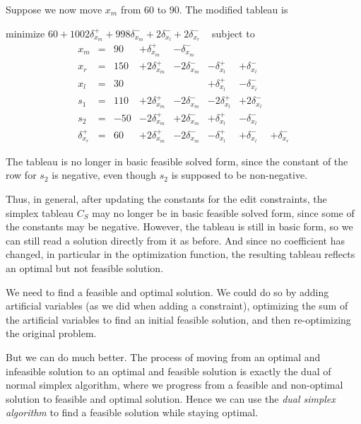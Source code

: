 \documentclass{article}
\begin{document}
Suppose we now move $x_m$ from 60 to 90.  
The modified tableau is 
\begin{trivlist}\item
minimize $60 + 1002 \delta_{x_m}^+ + 998 \delta_{x_m}^-  + 2
\delta_{x_l}^- + 2\delta_{x_r}^- $ 
~ subject to 
$$
\begin{array}{rlrrrrrr} 
x_m & = &90 &  + \delta_{x_m}^+ & - \delta_{x_m}^- \\
x_r & = &150 & + 2 \delta_{x_m}^+ & - 2\delta_{x_m}^- &
                - \delta_{x_l}^+ & + \delta_{x_l}^- \\ \hline
x_l & = & 30  & & & + \delta_{x_l}^+ & - \delta_{x_l}^- \\
s_1 & = &110 &  + 2 \delta_{x_m}^+ & - 2\delta_{x_m}^- &
                -2 \delta_{x_l}^+ & +2 \delta_{x_l}^- \\
s_2 & = &-50 &   - 2 \delta_{x_m}^+ &+2\delta_{x_m}^- &
                + \delta_{x_l}^+ & - \delta_{x_l}^- \\
\delta_{x_r}^+ & = & 60 & + 2 \delta_{x_m}^+  & - 2\delta_{x_m}^- &
        - \delta_{x_l}^+ & + \delta_{x_l}^- & +\delta_{x_r}^-
\end{array}
$$
\end{trivlist}
The tableau is no longer in basic feasible solved form,
since the constant of the row 
for $s_2$ is negative, even though $s_2$ is supposed to be non-negative.

Thus, in general, after updating the constants for the edit constraints,
the simplex tableau $C_S$ may no longer be in basic feasible solved form,
since some of the constants may be negative.  However, the tableau is still
in basic form, so we can still read a solution directly from it as before.
And since no coefficient has changed, in particular in the optimization
function, the resulting tableau reflects an optimal but not feasible
solution.

We need to find a feasible and optimal solution.  We could do so by adding
artificial variables (as we did when adding a constraint), optimizing the
sum of the artificial variables to find an initial feasible solution, and
then re-optimizing the original problem.

But we can do much better.  The process of moving from an optimal and
infeasible solution to an optimal and feasible solution is exactly the dual
of normal simplex algorithm, where we progress from a feasible and
non-optimal solution to feasible and optimal solution.  Hence we can use
the \emph{dual simplex algorithm} to find a feasible solution while staying
optimal.
\end{document}
